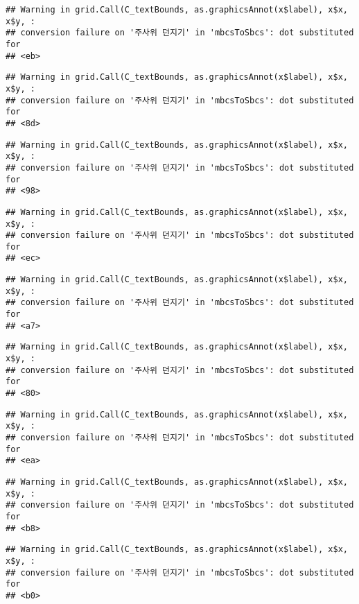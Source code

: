 \documentclass[]{book}
\begin{document}
\begin{verbatim}
## Warning in grid.Call(C_textBounds, as.graphicsAnnot(x$label), x$x, x$y, :
## conversion failure on '주사위 던지기' in 'mbcsToSbcs': dot substituted for
## <eb>
\end{verbatim}

\begin{verbatim}
## Warning in grid.Call(C_textBounds, as.graphicsAnnot(x$label), x$x, x$y, :
## conversion failure on '주사위 던지기' in 'mbcsToSbcs': dot substituted for
## <8d>
\end{verbatim}

\begin{verbatim}
## Warning in grid.Call(C_textBounds, as.graphicsAnnot(x$label), x$x, x$y, :
## conversion failure on '주사위 던지기' in 'mbcsToSbcs': dot substituted for
## <98>
\end{verbatim}

\begin{verbatim}
## Warning in grid.Call(C_textBounds, as.graphicsAnnot(x$label), x$x, x$y, :
## conversion failure on '주사위 던지기' in 'mbcsToSbcs': dot substituted for
## <ec>
\end{verbatim}

\begin{verbatim}
## Warning in grid.Call(C_textBounds, as.graphicsAnnot(x$label), x$x, x$y, :
## conversion failure on '주사위 던지기' in 'mbcsToSbcs': dot substituted for
## <a7>
\end{verbatim}

\begin{verbatim}
## Warning in grid.Call(C_textBounds, as.graphicsAnnot(x$label), x$x, x$y, :
## conversion failure on '주사위 던지기' in 'mbcsToSbcs': dot substituted for
## <80>
\end{verbatim}

\begin{verbatim}
## Warning in grid.Call(C_textBounds, as.graphicsAnnot(x$label), x$x, x$y, :
## conversion failure on '주사위 던지기' in 'mbcsToSbcs': dot substituted for
## <ea>
\end{verbatim}

\begin{verbatim}
## Warning in grid.Call(C_textBounds, as.graphicsAnnot(x$label), x$x, x$y, :
## conversion failure on '주사위 던지기' in 'mbcsToSbcs': dot substituted for
## <b8>
\end{verbatim}

\begin{verbatim}
## Warning in grid.Call(C_textBounds, as.graphicsAnnot(x$label), x$x, x$y, :
## conversion failure on '주사위 던지기' in 'mbcsToSbcs': dot substituted for
## <b0>
\end{verbatim}
\end{document}
